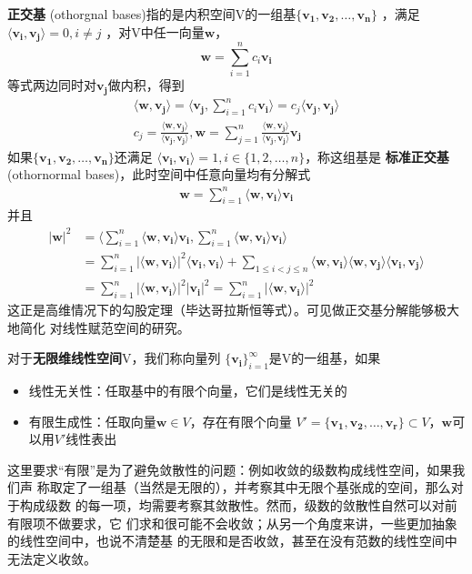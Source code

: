 \documentclass{ctexbook}
\begin{document}
\textbf{正交基} (othorgnal bases)指的是内积空间V的一组基$\{\mathbf{v_1},\mathbf{v_2},\dots ,\mathbf{v_n}\}$
，满足$\langle \mathbf{v_i},\mathbf{v_j}\rangle =0,i \neq j$ ，对V中任一向量$\mathbf{w}$，
\[\mathbf{w}=\sum_{i = 1}^{n}  c_i \mathbf{v_i}\]
等式两边同时对$\mathbf{v_j}$做内积，得到
\begin{align}
    \langle \mathbf{w},\mathbf{v_j} \rangle=\langle \mathbf{v_j},\sum_{i = 1}^{n}  c_i \mathbf{v_i} \rangle =c_j\langle \mathbf{v_j},\mathbf{v_j} \rangle \\
    c_j=\frac{\langle \mathbf{w},\mathbf{v_j} \rangle}{\langle \mathbf{v_j},\mathbf{v_j} \rangle},
    \mathbf{w}=\sum_{j = 1}^{n}  \frac{\langle \mathbf{w},\mathbf{v_j} \rangle}{\langle \mathbf{v_j},\mathbf{v_j} \rangle} \mathbf{v_j}\label{eq:2.2}
\end{align}
如果$\{\mathbf{v_1},\mathbf{v_2},\dots ,\mathbf{v_n}\}$还满足
$\langle \mathbf{v_i},\mathbf{v_i}\rangle =1,i \in \{1,2,\dots ,n\}$，称这组基是
\textbf{标准正交基} (othornormal bases)，此时空间中任意向量均有分解式
\begin{align}\label{eq:2.3}
    \mathbf{w}=\sum_{i=1}^{n}\langle \mathbf{w},\mathbf{v_i}\rangle \mathbf{v_i}
\end{align}
并且
\begin{align}
    |\mathbf{w}|^2 & =\langle \sum_{i=1}^{n}\langle \mathbf{w},\mathbf{v_i}\rangle \mathbf{v_i},\sum_{i=1}^{n}\langle \mathbf{w},\mathbf{v_i}\rangle \mathbf{v_i}\rangle                                           \\
                   & =\sum_{i=1}^{n}|\langle\mathbf{w,v_i}\rangle|^2\langle\mathbf{v_i,v_i}\rangle+\sum_{1\leq i<j\leq n}\langle \mathbf{w,v_i}\rangle\langle \mathbf{w,v_j}\rangle\langle \mathbf{v_i,v_j}\rangle \\
                   & =\sum_{i=1}^{n}|\langle\mathbf{w,v_i}\rangle|^2|\mathbf{v_i}|^2=\sum_{i=1}^{n}|\langle\mathbf{w,v_i}\rangle|^2\label{eq:2.6}
\end{align}
这正是高维情况下的勾股定理（毕达哥拉斯恒等式）。可见做正交基分解能够极大地简化
对线性赋范空间的研究。

对于\textbf{无限维线性空间}V，我们称向量列
$\lbrace\mathbf{v_i}\rbrace_{i=1}^{\infty}$是V的一组基，如果
\begin{itemize}
    \item \raggedright{} 线性无关性：任取基中的有限个向量，它们是线性无关的\\
    \item 有限生成性：任取向量$\mathbf{w} \in V$，存在有限个向量
          $V'=\lbrace\mathbf{v_1,v_2,\dots,v_r}\rbrace\subset V $，$\mathbf{w}$可以用$V'$线性表出
\end{itemize}
这里要求“有限”是为了避免敛散性的问题：例如收敛的级数构成线性空间，如果我们声
称取定了一组基（当然是无限的），并考察其中无限个基张成的空间，那么对于构成级数
的每一项，均需要考察其敛散性。然而，级数的敛散性自然可以对前有限项不做要求，它
们求和很可能不会收敛；从另一个角度来讲，一些更加抽象的线性空间中，也说不清楚基
的无限和是否收敛，甚至在没有范数的线性空间中无法定义收敛。
\end{document}

